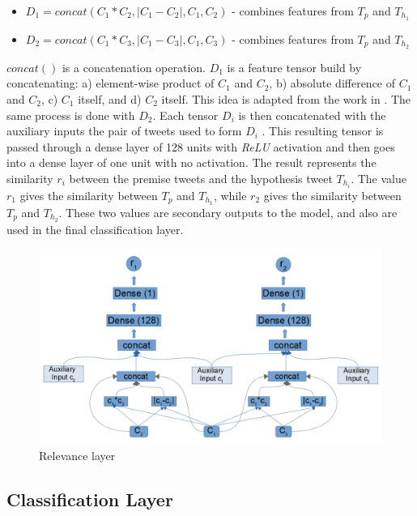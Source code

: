 \documentclass[12pt]{report}
\begin{document}
\begin{itemize}
	\item $D_1 = concat(C_1*C_2, |C_1 - C_2|, C_1, C_2)$  - combines features from $T_p$ and $T_{h_1}$
	\item $D_2 = concat(C_1*C_3, |C_1 - C_3|, C_1, C_3)$  - combines features from $T_p$ and $T_{h_2}$
\end{itemize}
$concat()$ is a concatenation operation. 
$D_1$ is  a feature tensor build by concatenating: a) element-wise product of $C_1$ and $C_2$, b) absolute difference of $C_1$ and $C_2$, c) $C_1$ itself, 
and d) $C_2$ itself. This idea is adapted from the work in \cite{Conneau2017}. 
The same process is done with $D_2$. 
Each  tensor $D_i$ is then concatenated with the auxiliary inputs the pair of tweets used to form $D_i$ . This resulting tensor is passed through  a dense layer of 128 units with {\em ReLU} activation and then goes into a dense layer of one unit with no activation. The result represents the similarity  $r_i$ between the premise  tweets  and the hypothesis tweet $T_{h_i}$.  The value $r_1$ gives the similarity between  $T_p$ and $T_{h_1}$, while $r_2$ gives the similarity between  $T_p$ and $T_{h_2}$.
These two values are secondary outputs to the model, and also are used in the final classification layer. 

\begin{figure}[H]	
	\centering
	\includegraphics[width=150mm, scale = 1]{images/14_relevance.png}	
	\caption{Relevance layer}	
	\label{figure:relevance}
\end{figure}

\subsection{Classification Layer}
\end{document}
